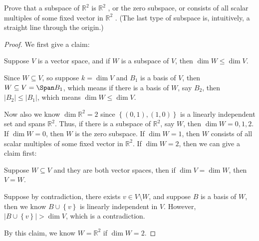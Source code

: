\begin{problem}
Prove that a subspace of \(\mathbb{R} ^2\)  is \(\mathbb{R} ^2\) , or the zero subspace, or consists of all
scalar multiples of some fixed vector in \(\mathbb{R} ^2\) . (The last type of subspace is, intuitively, a straight line through the origin.)
\end{problem}
\begin{proof}
    We first give a claim: 
    \begin{claim}
        Suppose \(V\) is a vector space, and if \(W\) is a subspace of \(V\), then \(\dim W \le \dim V\).  
    \end{claim}
    \begin{explanation}
        Since \(W \subseteq V\), so suppose \(k=\dim V\) and \(B_1\) is a basis of \(V\), then \(W \subseteq V = \Span B_1\), which means if there is a basis of \(W\), say \(B_2\), then \(\vert B_2 \vert \le \vert B_1 \vert\), which means \(\dim W \le \dim V\).         
    \end{explanation}

    Now also we know \(\dim \mathbb{R} ^2 = 2\) since \(\left\{ (0,1), (1, 0) \right\} \) is a linearly independent set and spans \(\mathbb{R} ^2\). Thus, if there is a subspace of \(\mathbb{R} ^2\), say \(W\), then \(\dim W = 0, 1, 2\). If \(\dim W = 0\), then \(W\) is the zero subspace. If \(\dim W = 1\), then \(W\) consists of all scalar multiples of some fixed vector in \(\mathbb{R} ^2\). If \(\dim W = 2\), then we can give a claim first: 
    \begin{claim}
        Suppose \(W \subseteq V\) and they are both vector spaces, then if \(\dim V = \dim W\), then \(V = W\).  
    \end{claim}        
    \begin{explanation}
        Suppose by contradiction, there exists \(v \in V \setminus W\), and suppose \(B\) is a basis of \(W\), then we know \(B \cup \left\{ v \right\} \) is linearly independent in \(V\). However, \(\left\vert B \cup \left\{ v \right\}  \right\vert > \dim V \), which is a contradiction.      
    \end{explanation}  
    By this claim, we know \(W = \mathbb{R} ^2\) if \(\dim W = 2\).    
\end{proof}

